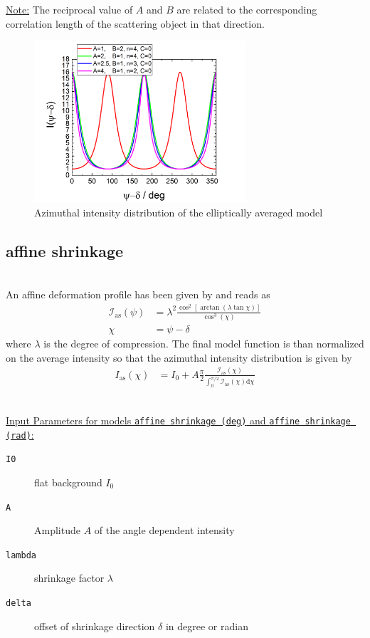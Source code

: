 \noindent \uline{Note:}
The reciprocal value of $A$ and $B$ are related to the corresponding correlation length of the scattering object in that direction.


\begin{figure}[htb]
\begin{center}
\includegraphics[width=0.7\textwidth]{../images/form_factor/azimuthal/ellipsoidal.png}
\end{center}
\caption{Azimuthal intensity distribution of the elliptically averaged model}
\label{fig:elliptically_averaged}
\end{figure}

\newpage

\subsection{affine shrinkage} ~\\
An affine deformation  profile has been given by \cite{Vilcinskas2015,Zlopasa2015} and reads as
\begin{align}
\mathcal{I}_\mathrm{as}(\psi) &= \lambda^2\frac{\cos^2\left[\arctan\left(\lambda \tan \chi\right)\right]}{\cos^3(\chi)} \\
\chi &= \psi-\delta
\end{align}
where $\lambda$ is the degree of compression. The final model function is than normalized on the average intensity so that the azimuthal intensity distribution is given by
\begin{align}
  I_\mathrm{as}(\chi) &= I_0 + A \frac{\pi}{2}\frac{\mathcal{I}_\mathrm{as}(\chi)}{\int_0^{\pi/2}\mathcal{I}_\mathrm{as}(\chi)\mathrm{d}\chi}
\end{align}

\hspace{1pt}\\
\uline{Input Parameters for models \texttt{affine shrinkage (deg)} and \texttt{affine shrinkage (rad)}:}\\
\begin{description}
\item[\texttt{I0}] flat background $I_0$
\item[\texttt{A}] Amplitude $A$ of the angle dependent intensity
\item[\texttt{lambda}] shrinkage factor $\lambda$
\item[\texttt{delta}] offset of shrinkage direction $\delta$ in degree or radian
\end{description}

